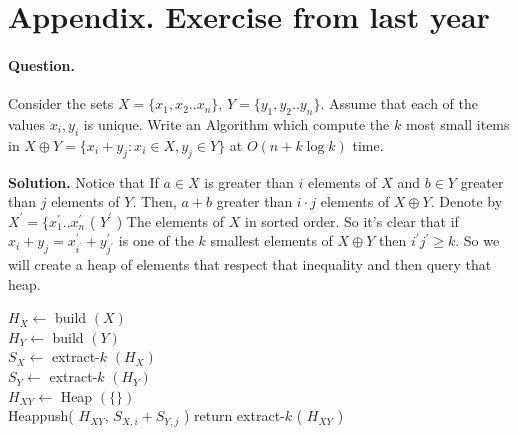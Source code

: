 \newpage

\section{ Appendix. Exercise from last year }

\paragraph{Question.} Consider the sets $X = \{x_1,x_2 .. x_n\}$, $Y = \{y_1, y_2 .. y_n\}$. Assume that each of the values $x_i,y_i$ is unique. Write an Algorithm which compute the $k$ most small items in $X \oplus Y = \{ x_{i} + y_{j} : x_{i} \in X , y_{j} \in Y  \} $ at $ O \left( n + k\log k  \right) $ time. 

\textbf{Solution.} Notice that If $a \in X$ is greater than $i$ elements of $X$ and $b \in Y$ greater than $j$ elements of $Y$. Then, $a + b$  greater than $i\cdot j$ elements of $X \oplus Y$. Denote by $X^\prime = \{ x^{\prime}_{1} .. x^{\prime}_{n}$ ( $Y^{\prime}$ ) The elements of $X$ in sorted order. So it's clear that if $x_{i}+y_{j} = x^{\prime}_{i^{\prime}} + y^{\prime}_{j^{\prime}}$ is one of the $k$ smallest elements of $X\oplus Y$ then $i^{\prime}j^{\prime} \ge k$. So we will create a heap of elements that respect that inequality and then query that heap.

\begin{algorithm}
$ H_{X} \leftarrow $ build $\left( X \right)$  \\ 
$ H_{Y} \leftarrow $ build $\left( Y \right)$  \\
$ S_{X} \leftarrow $ extract-$k$ $\left( H_{X} \right)$  \\ 
$ S_{Y} \leftarrow $ extract-$k$ $\left( H_{Y} \right)$  \\
$ H_{XY} \leftarrow $ Heap $(\{ \} )$ \\
 {
   {
  	Heappush( $H_{XY}$, $S_{X,i} + S_{Y, j}$ )    
  }
}
return extract-$k$ ( $H_{XY}$ ) 
\end{algorithm}


\newpage





